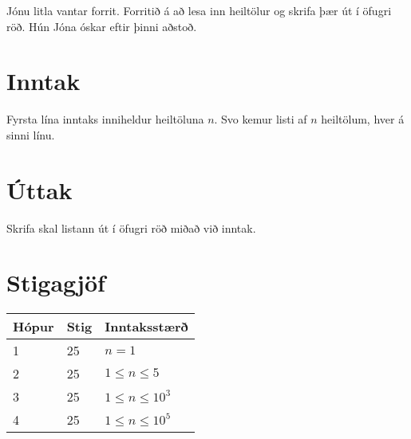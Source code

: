 
Jónu litla vantar forrit. Forritið á að lesa inn heiltölur og skrifa þær út í öfugri röð. Hún Jóna óskar eftir þinni aðstoð.

\section*{Inntak}
Fyrsta lína inntaks inniheldur heiltöluna $n$. Svo kemur listi af $n$ heiltölum, hver á sinni línu.

\section*{Úttak}
Skrifa skal listann út í öfugri röð miðað við inntak.

\section*{Stigagjöf}
\begin{tabular}{|l|l|l|}
\hline
Hópur & Stig & Inntaksstærð  \\ \hline
1     & 25         & $n = 1$ \\ \hline
2     & 25         & $1 \leq n \leq 5 $ \\ \hline
3     & 25         & $1 \leq n \leq 10^{3} $ \\ \hline
4     & 25         & $1 \leq n \leq 10^{5} $ \\ \hline
\end{tabular}

